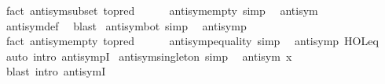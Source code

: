 \begin{isabellebody}
\ {\isacharparenleft}{\kern0pt}fact\ antisym{\isacharunderscore}{\kern0pt}subset\ {\isacharbrackleft}{\kern0pt}to{\isacharunderscore}{\kern0pt}pred{\isacharbrackright}{\kern0pt}{\isacharparenright}{\kern0pt}%
\endisatagproof
{\isafoldproof}%
%
\isadelimproof
\isanewline
%
\endisadelimproof
\ \ \ \ \isanewline
{}\isamarkupfalse%
\ antisym{\isacharunderscore}{\kern0pt}empty\ {\isacharbrackleft}{\kern0pt}simp{\isacharbrackright}{\kern0pt}{\isacharcolon}{\kern0pt}\isanewline
\ \ {\isachardoublequoteopen}antisym\ {\isacharbraceleft}{\kern0pt}{\isacharbraceright}{\kern0pt}{\isachardoublequoteclose}\isanewline
%
\isadelimproof
\ \ %
\endisadelimproof
%
\isatagproof
{}\isamarkupfalse%
\ antisym{\isacharunderscore}{\kern0pt}def\ \isamarkupfalse%
\ blast%
\endisatagproof
{\isafoldproof}%
%
\isadelimproof
\isanewline
%
\endisadelimproof
\isanewline
{}\isamarkupfalse%
\ antisym{\isacharunderscore}{\kern0pt}bot\ {\isacharbrackleft}{\kern0pt}simp{\isacharbrackright}{\kern0pt}{\isacharcolon}{\kern0pt}\isanewline
\ \ {\isachardoublequoteopen}antisymp\ {\isasymbottom}{\isachardoublequoteclose}\isanewline
%
\isadelimproof
\ \ %
\endisadelimproof
%
\isatagproof
{}\isamarkupfalse%
\ {\isacharparenleft}{\kern0pt}fact\ antisym{\isacharunderscore}{\kern0pt}empty\ {\isacharbrackleft}{\kern0pt}to{\isacharunderscore}{\kern0pt}pred{\isacharbrackright}{\kern0pt}{\isacharparenright}{\kern0pt}%
\endisatagproof
{\isafoldproof}%
%
\isadelimproof
\isanewline
%
\endisadelimproof
\ \ \ \ \isanewline
{}\isamarkupfalse%
\ antisymp{\isacharunderscore}{\kern0pt}equality\ {\isacharbrackleft}{\kern0pt}simp{\isacharbrackright}{\kern0pt}{\isacharcolon}{\kern0pt}\isanewline
\ \ {\isachardoublequoteopen}antisymp\ HOL{\isachardot}{\kern0pt}eq{\isachardoublequoteclose}\isanewline
%
\isadelimproof
\ \ %
\endisadelimproof
%
\isatagproof
{}\isamarkupfalse%
\ {\isacharparenleft}{\kern0pt}auto\ intro{\isacharcolon}{\kern0pt}\ antisympI{\isacharparenright}{\kern0pt}%
\endisatagproof
{\isafoldproof}%
%
\isadelimproof
\isanewline
%
\endisadelimproof
\isanewline
{}\isamarkupfalse%
\ antisym{\isacharunderscore}{\kern0pt}singleton\ {\isacharbrackleft}{\kern0pt}simp{\isacharbrackright}{\kern0pt}{\isacharcolon}{\kern0pt}\isanewline
\ \ {\isachardoublequoteopen}antisym\ {\isacharbraceleft}{\kern0pt}x{\isacharbraceright}{\kern0pt}{\isachardoublequoteclose}\isanewline
%
\isadelimproof
\ \ %
\endisadelimproof
%
\isatagproof
{}\isamarkupfalse%
\ {\isacharparenleft}{\kern0pt}blast\ intro{\isacharcolon}{\kern0pt}\ antisymI{\isacharparenright}{\kern0pt}%

\end{isabellebody}
